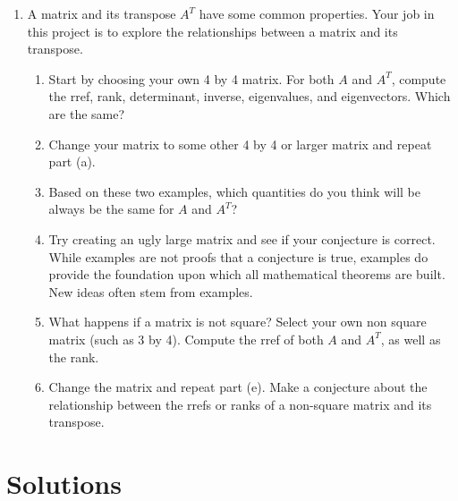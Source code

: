 \begin{enumerate}
	\item A matrix and its transpose $A^T$ have some common properties. Your job in this project is to explore the relationships between a matrix and its transpose.	
	
\begin{enumerate}
	\item Start by choosing your own 4 by 4 matrix.  For both $A$ and $A^T$, compute the rref, rank, determinant, inverse, eigenvalues, and eigenvectors. Which are the same? 
	\item Change your matrix to some other 4 by 4 or larger matrix and repeat part (a). 
	\item Based on these two examples, which quantities do you think will be always be the same for $A$ and $A^T$? 
	\item Try creating an ugly large matrix and see if your conjecture is correct. While examples are not proofs that a conjecture is true, examples do provide the foundation upon which all mathematical theorems are built.  New ideas often stem from examples.
	\item What happens if a matrix is not square? Select your own non square matrix (such as 3 by 4). Compute the rref of both $A$ and $A^T$, as well as the rank. 
	\item Change the matrix and repeat part (e). Make a conjecture about the relationship between the rrefs or ranks of a non-square matrix and its transpose.
\end{enumerate}
\end{enumerate}








\section{Solutions}




